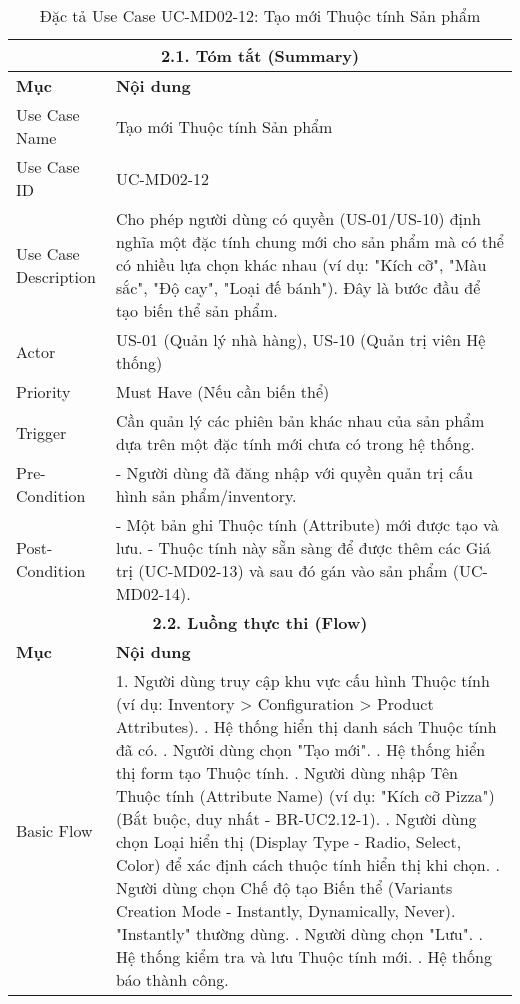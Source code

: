 \begin{longtable}{|m{4cm}|p{11cm}|}
\caption{Đặc tả Use Case UC-MD02-12: Tạo mới Thuộc tính Sản phẩm} \label{tab:uc_md02_12_revised} \\
\hline
\multicolumn{2}{|c|}{\textbf{2.1. Tóm tắt (Summary)}} \\
\hline
\textbf{Mục} & \textbf{Nội dung} \\
\hline
\endhead %
\hline
\endfoot %
\hline
\endlastfoot %
Use Case Name & Tạo mới Thuộc tính Sản phẩm \\
\hline
Use Case ID & UC-MD02-12 \\
\hline
Use Case Description & Cho phép người dùng có quyền (US-01/US-10) định nghĩa một đặc tính chung mới cho sản phẩm mà có thể có nhiều lựa chọn khác nhau (ví dụ: "Kích cỡ", "Màu sắc", "Độ cay", "Loại đế bánh"). Đây là bước đầu để tạo biến thể sản phẩm. \\
\hline
Actor & US-01 (Quản lý nhà hàng), US-10 (Quản trị viên Hệ thống) \\
\hline
Priority & Must Have (Nếu cần biến thể) \\
\hline
Trigger & Cần quản lý các phiên bản khác nhau của sản phẩm dựa trên một đặc tính mới chưa có trong hệ thống. \\
\hline
Pre-Condition & - Người dùng đã đăng nhập với quyền quản trị cấu hình sản phẩm/inventory. \\
\hline
Post-Condition & - Một bản ghi Thuộc tính (Attribute) mới được tạo và lưu. \newline - Thuộc tính này sẵn sàng để được thêm các Giá trị (UC-MD02-13) và sau đó gán vào sản phẩm (UC-MD02-14). \\
\hline
\multicolumn{2}{|c|}{\textbf{2.2. Luồng thực thi (Flow)}} \\
\hline
\textbf{Mục} & \textbf{Nội dung} \\
\hline
Basic Flow & 1. Người dùng truy cập khu vực cấu hình Thuộc tính (ví dụ: Inventory > Configuration > Product Attributes). \newline 2. Hệ thống hiển thị danh sách Thuộc tính đã có. \newline 3. Người dùng chọn "Tạo mới". \newline 4. Hệ thống hiển thị form tạo Thuộc tính. \newline 5. Người dùng nhập Tên Thuộc tính (Attribute Name) (ví dụ: "Kích cỡ Pizza") (Bắt buộc, duy nhất - BR-UC2.12-1). \newline 6. Người dùng chọn Loại hiển thị (Display Type - Radio, Select, Color) để xác định cách thuộc tính hiển thị khi chọn. \newline 7. Người dùng chọn Chế độ tạo Biến thể (Variants Creation Mode - Instantly, Dynamically, Never). "Instantly" thường dùng. \newline 8. Người dùng chọn "Lưu". \newline 9. Hệ thống kiểm tra và lưu Thuộc tính mới. \newline 10. Hệ thống báo thành công. \\

\end{longtable}
